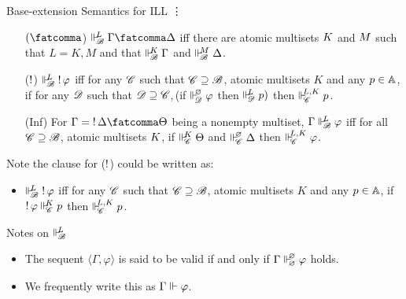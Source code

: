 \documentclass{beamer}
\begin{document}
\begin{frame}{Base-extension Semantics for ILL}
	\hspace{0.5\textwidth}\vdots
	\begin{center}
	\begin{itemize}
        \item[$(\fatcomma$)] $\suppM{\baseB}{\at{L}}\Gamma\fatcomma\Delta$ iff there are atomic multisets ${K}$ and ${M}$ such that $L=K,M$ and that $\Vdash_{ \!\!\mathscr{B} }^{ \!\!{K} }\Gamma$ and $\Vdash_{ \!\!\mathscr{B} }^{ \!\!{M} }\Delta$.
        \item[($\mathop{!}$)] $\Vdash_{ \!\!\mathscr{B} }^{ \!\!L } \mathop{!} \varphi$ iff for any $\mathscr{C}$ such that $\mathscr{C} \supseteq \mathscr{B}$, atomic multisets $K$ and any ${p} \in \mathbb{A}$, if for any $\mathscr{D}$ such that $\mathscr{D}\supseteq\mathscr{C}$,\,(if $\Vdash_{ \!\!\mathscr{D} }^{ \!\!\varnothing }\varphi$ then $\Vdash_{ \!\!\mathscr{D} }^{ \!\!L }{p})$ then $\Vdash_{ \!\!\mathscr{C} }^{ \!\!L,K }{p}$.
        \item[(Inf)] For $\Gamma=\bang\Delta\fatcomma\Theta$ being a nonempty multiset, $\Gamma \Vdash_{ \!\!\mathscr{B} }^{ \!\!L }\varphi$ iff for all $\mathscr{C} \supseteq \mathscr{B}$, atomic multisets ${K}$, if $\Vdash_{ \!\!\mathscr{C} }^{ \!\!{K} }\Theta$ and $\Vdash_{ \!\!\mathscr{C} }^{ \!\!\varnothing }\Delta$ then $\Vdash_{ \!\!\mathscr{C} }^{ \!\!L,K }\varphi$.
	\end{itemize}
	\end{center}
	\pause
	Note the clause for ($\mathop{!}$) could be written as:
	\begin{itemize}
		\item $\Vdash_{ \!\!\mathscr{B} }^{ \!\!L } \mathop{!} \varphi$ iff for any $\mathscr{C}$ such that $\mathscr{C} \supseteq \mathscr{B}$, atomic multisets $K$ and any ${p} \in \mathbb{A}$, if $\mathop{!}\varphi\Vdash_{ \!\!\mathscr{C} }^{ \!\!K }{p}$ then $\Vdash_{ \!\!\mathscr{C} }^{ \!\!L,K }{p}$.
	\end{itemize}
	\end{frame}
\begin{frame}{Notes on $\Vdash_{ \!\!\mathscr{B} }^{ \!\!{L} }$}
	\begin{itemize}
	\item The sequent $\langle\Gamma,\varphi\rangle$ is said to be valid if and only if $\Gamma\Vdash_{ \!\!\varnothing }^{ \!\!\varnothing }\varphi$ holds.
	\pause
	\item We frequently write this as $\Gamma \Vdash_{ \!\! }^{ \!\! }\varphi$.
	\end{itemize}
\end{frame}
\end{document}
